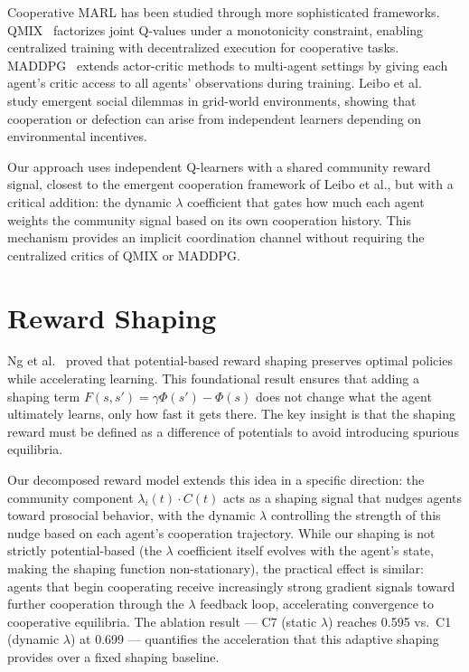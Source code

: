 \documentclass[12pt, a4paper, oneside]{report}
\begin{document}
Cooperative MARL has been studied through more sophisticated frameworks. QMIX~\cite{rashid2018qmix} factorizes joint Q-values under a monotonicity constraint, enabling centralized training with decentralized execution for cooperative tasks. MADDPG~\cite{lowe2017maddpg} extends actor-critic methods to multi-agent settings by giving each agent's critic access to all agents' observations during training. Leibo et al.~\cite{leibo2017multi} study emergent social dilemmas in grid-world environments, showing that cooperation or defection can arise from independent learners depending on environmental incentives.

Our approach uses independent Q-learners with a shared community reward signal, closest to the emergent cooperation framework of Leibo et al., but with a critical addition: the dynamic $\lambda$ coefficient that gates how much each agent weights the community signal based on its own cooperation history. This mechanism provides an implicit coordination channel without requiring the centralized critics of QMIX or MADDPG.

\section{Reward Shaping}
\label{sec:reward-shaping}

Ng et al.~\cite{ng1999rewardshaping} proved that potential-based reward shaping preserves optimal policies while accelerating learning. This foundational result ensures that adding a shaping term $F(s, s') = \gamma \Phi(s') - \Phi(s)$ does not change what the agent ultimately learns, only how fast it gets there. The key insight is that the shaping reward must be defined as a difference of potentials to avoid introducing spurious equilibria.

Our decomposed reward model extends this idea in a specific direction: the community component $\lambda_i(t) \cdot C(t)$ acts as a shaping signal that nudges agents toward prosocial behavior, with the dynamic $\lambda$ controlling the strength of this nudge based on each agent's cooperation trajectory. While our shaping is not strictly potential-based (the $\lambda$ coefficient itself evolves with the agent's state, making the shaping function non-stationary), the practical effect is similar: agents that begin cooperating receive increasingly strong gradient signals toward further cooperation through the $\lambda$ feedback loop, accelerating convergence to cooperative equilibria. The ablation result --- C7 (static $\lambda$) reaches 0.595 vs.\ C1 (dynamic $\lambda$) at 0.699 --- quantifies the acceleration that this adaptive shaping provides over a fixed shaping baseline.
\end{document}
